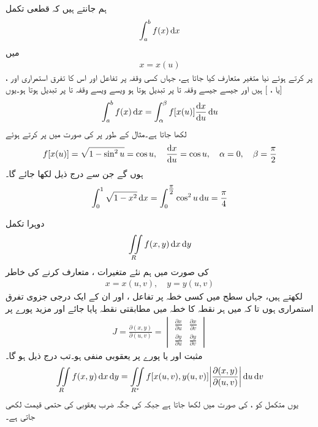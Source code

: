 ہم جانتے ہیں کہ قطعی تکمل
\begin{align*}
\int_a^b f(x)\dif x
\end{align*}
میں
\begin{align*}
x=x(u)
\end{align*}
پر کرتے ہوئے نیا متغیر  متعارف  کیا جاتا ہے، جہاں کسی وقفہ  پر تفاعل  اور اس کا تفرق استمراری   اور ،  [یا ، ] ہیں اور  جیسے جیسے  وقفہ  تا  پر تبدیل ہوتا ہو ویسے ویسے  وقفہ  تا  پر  تبدیل ہوتا ہو۔یوں
\begin{align}
\int_a^b f(x)\dif x=\int_{\alpha}^{\beta} f[x(u)]\frac{\dif x}{\dif u}\dif u
\end{align}
لکھا جاتا ہے۔مثال کے طور پر  کی صورت میں  پر کرتے ہوئے
\begin{align*}
f[x(u)]=\sqrt{1-\sin^2 u}=\cos u, \quad \frac{\dif x}{\dif u}=\cos u, \quad \alpha=0,\quad \beta=\frac{\pi}{2}
\end{align*}
ہوں گے جن سے درج ذیل لکھا جائے گا۔
\begin{align*}
\int_0^1\sqrt{1-x^2}\dif x=\int_{0}^{\tfrac{\pi}{2}} \cos^2 u\dif u=\frac{\pi}{4}
\end{align*}

دوہرا تکمل
\begin{align*}
\iint\limits_R f(x,y)\dif x\dif y
\end{align*}
کی صورت میں ہم نئے متغیرات ،  متعارف کرنے کی خاطر
\begin{align*}
x=x(u,v),\quad y=y(u,v)
\end{align*}
لکھتے ہیں، جہاں  سطح میں کسی خطہ  پر تفاعل ،  اور ان کے ایک درجی جزوی تفرق استمراری ہوں تا کہ  میں ہر نقطہ  کا خطہ  میں مطابقتی نقطہ  پایا جائے اور مزید پورے  پر  
\begin{align*}
J=\frac{\partial (x,y)}{\partial (u,v)}=
\begin{vmatrix}
\frac{\partial x}{\partial u}&\frac{\partial x}{\partial v}\\[0.5em]
\frac{\partial y}{\partial u}&\frac{\partial y}{\partial v}
\end{vmatrix}
\end{align*}
مثبت اور یا پورے  پر یعقوبی  منفی ہو۔تب درج ذیل ہو گا۔
\begin{align}\label{مساوات_خطی_تکمل_دوہرا_تبدیلی_متغیرات}
\iint\limits_R f(x,y)\dif x\dif y=\iint\limits_{R^*} f[x(u,v),y(u,v)]\abs{\frac{\partial (x,y)}{\partial (u,v)}}\dif u\dif v
\end{align}
یوں متکمل کو ،  کی صورت میں لکھا جاتا ہے جبکہ  کی جگہ  ضرب یعقوبی  کی حتمی قیمت لکھی جاتی ہے۔

